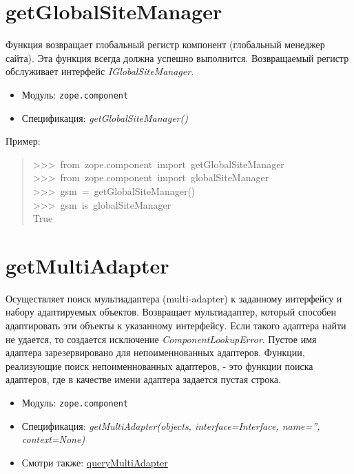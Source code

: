 \documentclass[14pt,a4paper,openany,twoside,final]{extbook}
\providecommand*{\DUroletitlereference}[1]{\textsl{#1}}
\begin{document}
\section*{getGlobalSiteManager%
  \label{getglobalsitemanager}%
}

Функция возвращает глобальный регистр компонент (глобальный менеджер
сайта).  Эта функция всегда должна успешно выполнится.  Возвращаемый
регистр обслуживает интерфейс \DUroletitlereference{IGlobalSiteManager}.

\begin{itemize}

\item Модуль: \texttt{zope.component}

\item Спецификация: \DUroletitlereference{getGlobalSiteManager()}

\end{itemize}

Пример:

\begin{quote}{\ttfamily \raggedright \noindent
>{}>{}>~from~zope.component~import~getGlobalSiteManager\\
>{}>{}>~from~zope.component~import~globalSiteManager\\
>{}>{}>~gsm~=~getGlobalSiteManager()\\
>{}>{}>~gsm~is~globalSiteManager\\
True
}
\end{quote}


\section*{getMultiAdapter%
  \label{getmultiadapter}%
}

Осуществляет поиск мультиадаптера (multi-adapter) к заданному
интерфейсу и набору адаптируемых объектов.  Возвращает мультиадаптер,
который способен адаптировать эти объекты к указанному интерфейсу.
Если такого адаптера найти не удается, то создается исключение
\DUroletitlereference{ComponentLookupError}.  Пустое имя адаптера зарезервировано для
непоименнованных адаптеров.  Функции, реализующие поиск
непоименнованных адаптеров, - это функции поиска адаптеров, где в
качестве имени адаптера задается пустая строка.

\begin{itemize}

\item Модуль: \texttt{zope.component}

\item Спецификация: \DUroletitlereference{getMultiAdapter(objects, interface=Interface, name='',
context=None)}

\item Смотри также: \hyperref[querymultiadapter]{queryMultiAdapter}

\end{itemize}
\end{document}
